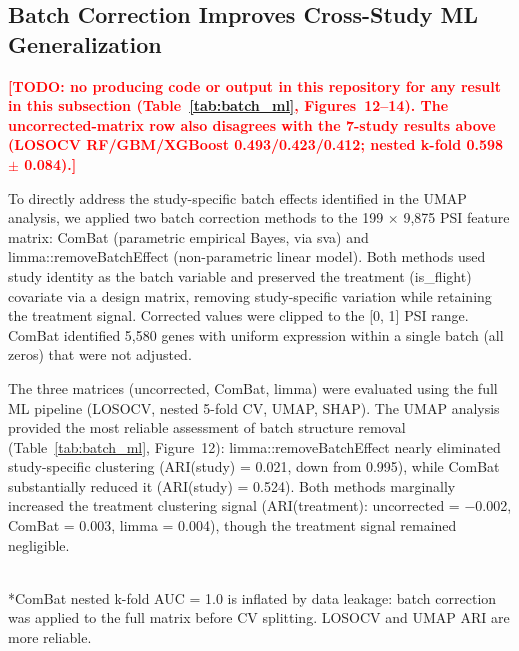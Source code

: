 \documentclass[12pt,a4paper]{article}
\newcommand{\TODO}[1]{\textcolor{red}{\textbf{[TODO: #1]}}}
\begin{document}
\subsection{Batch Correction Improves Cross-Study ML Generalization}

\TODO{no producing code or output in this repository for any result in this subsection (Table~\ref{tab:batch_ml}, Figures~12--14). The uncorrected-matrix row also disagrees with the 7-study results above (LOSOCV RF/GBM/XGBoost 0.493/0.423/0.412; nested k-fold 0.598 $\pm$ 0.084).}

To directly address the study-specific batch effects identified in the UMAP analysis, we applied two batch correction methods to the 199 $\times$ 9,875 PSI feature matrix: ComBat (parametric empirical Bayes, via sva) and limma::removeBatchEffect (non-parametric linear model). Both methods used study identity as the batch variable and preserved the treatment (is\_flight) covariate via a design matrix, removing study-specific variation while retaining the treatment signal. Corrected values were clipped to the [0, 1] PSI range. ComBat identified 5,580 genes with uniform expression within a single batch (all zeros) that were not adjusted.

The three matrices (uncorrected, ComBat, limma) were evaluated using the full ML pipeline (LOSOCV, nested 5-fold CV, UMAP, SHAP). The UMAP analysis provided the most reliable assessment of batch structure removal (Table~\ref{tab:batch_ml}, Figure~12): limma::removeBatchEffect nearly eliminated study-specific clustering (ARI(study) = 0.021, down from 0.995), while ComBat substantially reduced it (ARI(study) = 0.524). Both methods marginally increased the treatment clustering signal (ARI(treatment): uncorrected = $-$0.002, ComBat = 0.003, limma = 0.004), though the treatment signal remained negligible.

\begin{table}[htbp]
\centering
\caption{Batch correction ML comparison (3 matrices). \TODO{no producing code or output in this repository}}
\label{tab:batch_ml}
\\[2pt]
\footnotesize{*ComBat nested k-fold AUC = 1.0 is inflated by data leakage: batch correction was applied to the full matrix before CV splitting. LOSOCV and UMAP ARI are more reliable.}
\end{table}
\end{document}
